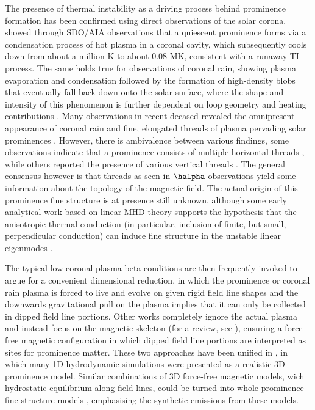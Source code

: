 The presence of thermal instability as a driving process behind prominence formation has been confirmed using direct observations of the solar corona. \citet{berger2012} showed through SDO/AIA observations that a quiescent prominence forms via a condensation process of hot plasma in a coronal cavity, which subsequently cools down from about a million K to about 0.08 MK, consistent with a runaway TI process. The same holds true for observations of coronal rain, showing plasma evaporation and condensation followed by the formation of high-density blobs that eventually fall back down onto the solar surface, where the shape and intensity of this phenomenon is further dependent on loop geometry and heating contributions \citep{auchere2018}. Many observations in recent decased revealed the omnipresent appearance of coronal rain \citep{kamio2011,antolin2015} and fine, elongated threads of plasma pervading solar prominences \citep{engvold1998,mackay2010}. However, there is ambivalence between various findings, some observations indicate that a prominence consists of multiple horizontal threads \citep{casini2003,okamoto2007}, while others reported the presence of various vertical threads \citep{berger2008}. The general consensus however is that threads as seen in $\halpha$ observations yield some information about the topology of the magnetic field. The actual origin of this prominence fine structure is at presence still unknown, although some early analytical work based on linear MHD theory supports the hypothesis that the anisotropic thermal conduction (in particular, inclusion of finite, but small, perpendicular conduction) can induce fine structure in the unstable linear eigenmodes \citep{vanderlinden1991}.

The typical low coronal plasma beta conditions are then frequently invoked to argue for a convenient dimensional reduction, in which the prominence or coronal rain plasma is forced to live and evolve on given rigid field line shapes and the downwards gravitational pull on the plasma implies that it can only be collected in dipped field line portions. Other works completely ignore the actual plasma and instead focus on the magnetic skeleton (for a review, see \citet{gibson2018}), ensuring a force-free magnetic configuration in which dipped field line portions are interpreted as sites for prominence matter. These two approaches have been unified in \citet{luna2012}, in which many 1D hydrodynamic simulations were presented as a realistic 3D prominence model. Similar combinations of 3D force-free magnetic models, wich hydrostatic equilibrium along field lines, could be turned into whole prominence fine structure models \citep{gunar2015}, emphasising the synthetic emissions from these models.

